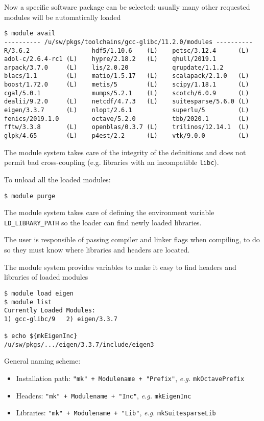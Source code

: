 \documentclass[10pt]{beamer}
\begin{document}
\begin{frame}[fragile]
  \small
  Now a specific software package can be selected: usually many other requested modules will be automatically loaded
\begin{verbatim}
$ module avail
---------- /u/sw/pkgs/toolchains/gcc-glibc/11.2.0/modules ----------
R/3.6.2                 hdf5/1.10.6    (L)    petsc/3.12.4      (L)
adol-c/2.6.4-rc1 (L)    hypre/2.18.2   (L)    qhull/2019.1
arpack/3.7.0     (L)    lis/2.0.20            qrupdate/1.1.2
blacs/1.1        (L)    matio/1.5.17   (L)    scalapack/2.1.0   (L)
boost/1.72.0     (L)    metis/5        (L)    scipy/1.18.1      (L)
cgal/5.0.1              mumps/5.2.1    (L)    scotch/6.0.9      (L)
dealii/9.2.0     (L)    netcdf/4.7.3   (L)    suitesparse/5.6.0 (L)
eigen/3.3.7      (L)    nlopt/2.6.1           superlu/5         (L)
fenics/2019.1.0         octave/5.2.0          tbb/2020.1        (L)
fftw/3.3.8       (L)    openblas/0.3.7 (L)    trilinos/12.14.1  (L)
glpk/4.65        (L)    p4est/2.2      (L)    vtk/9.0.0         (L)
\end{verbatim}

The module system takes care of the integrity of the definitions and does not permit bad cross-coupling (e.g. libraries with an incompatible \texttt{libc}).\smallskip

To unload all the loaded modules:
\begin{verbatim}
$ module purge
\end{verbatim}
\end{frame}


\begin{frame}[fragile]

  The module system takes care of defining the environment variable \texttt{LD\_LIBRARY\_PATH} so the loader can find newly loaded libraries.

  The user is responsible of passing compiler and linker flags when compiling, to do so they must know where libraries and headers are located.

  The module system provides variables to make it easy to find headers and libraries of loaded modules

\begin{verbatim}
$ module load eigen
$ module list
Currently Loaded Modules:
1) gcc-glibc/9   2) eigen/3.3.7

$ echo ${mkEigenInc}
/u/sw/pkgs/.../eigen/3.3.7/include/eigen3
\end{verbatim}

General naming scheme: 
\begin{itemize}
\item Installation path: \texttt{"mk" + Modulename + "Prefix"}, \textit{e.g.} \texttt{mkOctavePrefix}
\item Headers: \texttt{"mk" + Modulename + "Inc"}, \textit{e.g.} \texttt{mkEigenInc}
\item Libraries: \texttt{"mk" + Modulename + "Lib"}, \textit{e.g.} \texttt{mkSuitesparseLib}
\end{itemize}
\end{frame}
\end{document}
